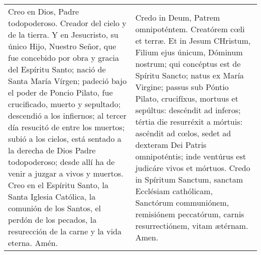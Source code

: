 \documentclass[../devocionario.tex]{subfiles}
\begin{document}
    \begin{longtable} { p{} p{} }
        Creo en Dios, Padre todopoderoso. Creador del cielo y de la tierra. Y en Jesucristo, su único Hijo, Nuestro Señor, 
        que fue concebido por obra y gracia del Espíritu Santo; nació de Santa María Vírgen; padeció bajo el poder de Poncio Pilato, 
        fue crucificado, muerto y sepultado; descendió a los infiernos; al tercer día resucitó de entre los muertos; subió a los cielos, 
        está sentado a la derecha de Dios Padre todopoderoso; desde allí ha de venir a juzgar a vivos y muertos. 
        Creo en el Espíritu Santo, la Santa Iglesia Católica, la comunión de los Santos, el perdón de los pecados, 
        la resurección de la carne y la vida eterna. Amén. &
        Credo in Deum, Patrem omnipoténtem. Creatórem cœli et terræ. Et in Jesum CHristum, Filium ejus únicum, Dóminum nostrum; 
        qui concéptus est de Spíritu Sancto; natus ex María Virgine; passus sub Póntio Pilato, crucifíxus, mortuus et sepúltus: 
        descéndit ad inferos; tértia die resurréxit a mórtuis: ascéndit ad cœlos, sedet ad dexteram Dei Patris omnipoténtis; 
        inde ventúrus est judicáre vivos et mórtuos. Credo in Spíritum Sanctum, sanctam Ecclésiam cathólicam, Sanctórum communiónem, 
        remisiónem peccatórum, carnis resurrectiónem, vitam ætérnam. Amen.
    \end{longtable}
\end{document}
